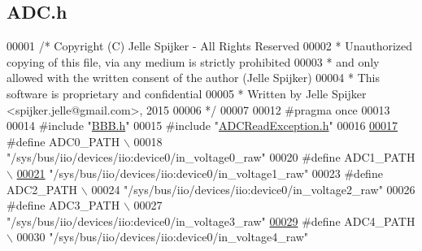 \hypertarget{_a_d_c_8h_source}{}\subsection{A\+D\+C.\+h}
\label{_a_d_c_8h_source}

\begin{DoxyCode}
00001 \textcolor{comment}{/* Copyright (C) Jelle Spijker - All Rights Reserved}
00002 \textcolor{comment}{ * Unauthorized copying of this file, via any medium is strictly prohibited}
00003 \textcolor{comment}{ * and only allowed with the written consent of the author (Jelle Spijker)}
00004 \textcolor{comment}{ * This software is proprietary and confidential}
00005 \textcolor{comment}{ * Written by Jelle Spijker <spijker.jelle@gmail.com>, 2015}
00006 \textcolor{comment}{ */}
00007 
00012 \textcolor{preprocessor}{#pragma once}
00013 
00014 \textcolor{preprocessor}{#include "\hyperlink{_b_b_b_8h}{BBB.h}"}
00015 \textcolor{preprocessor}{#include "\hyperlink{_a_d_c_read_exception_8h}{ADCReadException.h}"}
00016 
\hypertarget{_a_d_c_8h_source_l00017}{}\hyperlink{_a_d_c_8h_a597a5b4b81296d8d567bb8251f29e51c}{00017} \textcolor{preprocessor}{#define ADC0\_PATH                                                              \(\backslash\)}
00018 \textcolor{preprocessor}{  "/sys/bus/iio/devices/iio:device0/in\_voltage0\_raw" }
00020 \textcolor{preprocessor}{#define ADC1\_PATH                                                              \(\backslash\)}
\hypertarget{_a_d_c_8h_source_l00021}{}\hyperlink{_a_d_c_8h_a042dc32b894680e50456be83ef44a281}{00021} \textcolor{preprocessor}{  "/sys/bus/iio/devices/iio:device0/in\_voltage1\_raw" }
00023 \textcolor{preprocessor}{#define ADC2\_PATH                                                              \(\backslash\)}
00024 \textcolor{preprocessor}{  "/sys/bus/iio/devices/iio:device0/in\_voltage2\_raw" }
00026 \textcolor{preprocessor}{#define ADC3\_PATH                                                              \(\backslash\)}
00027 \textcolor{preprocessor}{  "/sys/bus/iio/devices/iio:device0/in\_voltage3\_raw" }
\hypertarget{_a_d_c_8h_source_l00029}{}\hyperlink{_a_d_c_8h_a97ea71f953cb0949dd23883f4193b454}{00029} \textcolor{preprocessor}{#define ADC4\_PATH                                                              \(\backslash\)}
00030 \textcolor{preprocessor}{  "/sys/bus/iio/devices/iio:device0/in\_voltage4\_raw" }

\end{DoxyCode}
